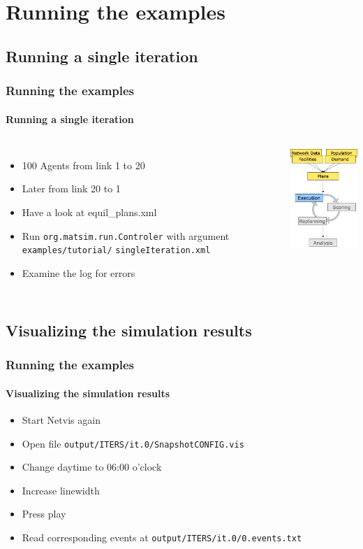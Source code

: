 \section{Running the examples}

\subsection{Running a single iteration}

\begin{frame}[fragile]
\frametitle{Running the examples}
\framesubtitle{Running a single iteration}
\begin{columns}[T]

\column{7cm}

\begin{itemize}
  \item 100 Agents from link 1 to 20
  \item Later from link 20 to 1
  \item Have a look at equil\_plans.xml
  \item Run \verb|org.matsim.run.Controler| with argument \verb|examples/tutorial/| \verb|singleIteration.xml|
  \item Examine the log for errors
\end{itemize}

\column{5cm}
\includegraphics[width=4cm]{../graphics/overviewMatsimExecution.png}

\end{columns}

\end{frame}

\subsection{Visualizing the simulation results}

\begin{frame}[fragile]
\frametitle{Running the examples}
\framesubtitle{Visualizing the simulation results}
\begin{itemize}
  \item Start Netvis again
  \item Open file \verb|output/ITERS/it.0/SnapshotCONFIG.vis|
  \item Change daytime to 06:00 o'clock
  \item Increase linewidth
  \item Press play
  \item Read corresponding events at \verb|output/ITERS/it.0/0.events.txt|
\end{itemize}
\end{frame}


